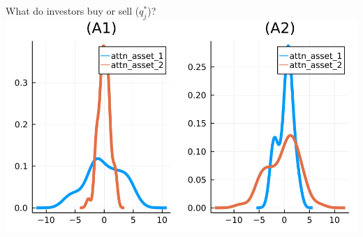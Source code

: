 \documentclass[
  ignorenonframetext,
]{beamer}
\begin{document}
\begin{frame}{What do investors buy or sell (\(q_j^*\))?}
\includegraphics[width=0.4\paperwidth]{complexity_files/figure-beamer/unnamed-chunk-19-4}
\end{frame}
\end{document}
